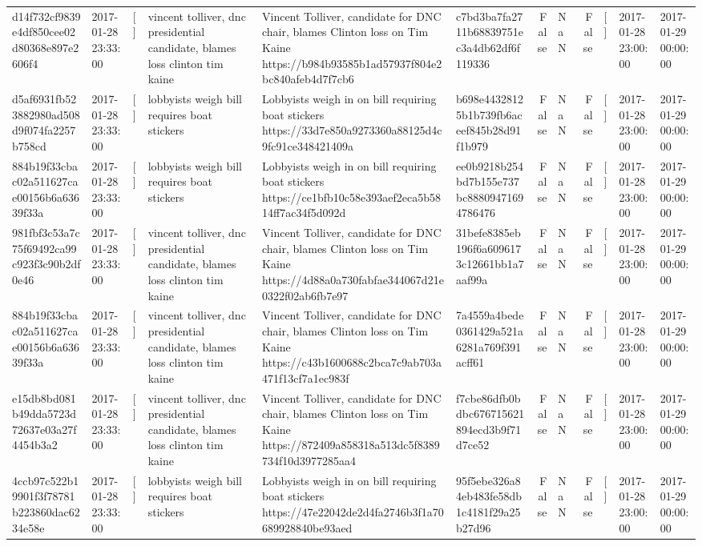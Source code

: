 \begin{tabular}{llllllrlrlll}
d14f732cf9839e4df850cee02d80368e897e2606f4 & 2017-01-28 23:33:00 & [] & vincent tolliver, dnc presidential candidate, blames loss clinton tim kaine & Vincent Tolliver, candidate for DNC chair, blames Clinton loss on Tim Kaine https://b984b93585b1ad57937f804e2bc840afeb4d7f7cb6 & c7bd3ba7fa2711b68839751ec3a4db62df6f119336 & False & NaN & False & [] & 2017-01-28 23:00:00 & 2017-01-29 00:00:00 \\
d5af6931fb523882980ad508d9f074fa2257b758cd & 2017-01-28 23:33:00 & [] & lobbyists weigh bill requires boat stickers & Lobbyists weigh in on bill requiring boat stickers https://33d7e850a9273360a88125d4c9fc91ce348421409a & b698e44328125b1b739fb6aceef845b28d91f1b979 & False & NaN & False & [] & 2017-01-28 23:00:00 & 2017-01-29 00:00:00 \\
884b19f33cbac02a511627cae00156b6a63639f33a & 2017-01-28 23:33:00 & [] & lobbyists weigh bill requires boat stickers & Lobbyists weigh in on bill requiring boat stickers https://ce1bfb10c58e393aef2eca5b5814ff7ac34f5d092d & ee0b9218b254bd7b155e737bc88809471694786476 & False & NaN & False & [] & 2017-01-28 23:00:00 & 2017-01-29 00:00:00 \\
981fbf3c53a7c75f69492ca99c923f3c90b2df0e46 & 2017-01-28 23:33:00 & [] & vincent tolliver, dnc presidential candidate, blames loss clinton tim kaine & Vincent Tolliver, candidate for DNC chair, blames Clinton loss on Tim Kaine https://4d88a0a730fabfae344067d21e0322f02ab6fb7e97 & 31befe8385eb196f6a6096173c12661bb1a7aaf99a & False & NaN & False & [] & 2017-01-28 23:00:00 & 2017-01-29 00:00:00 \\
884b19f33cbac02a511627cae00156b6a63639f33a & 2017-01-28 23:33:00 & [] & vincent tolliver, dnc presidential candidate, blames loss clinton tim kaine & Vincent Tolliver, candidate for DNC chair, blames Clinton loss on Tim Kaine https://c43b1600688c2bca7c9ab703a471f13cf7a1ec983f & 7a4559a4bede0361429a521a6281a769f391acff61 & False & NaN & False & [] & 2017-01-28 23:00:00 & 2017-01-29 00:00:00 \\
e15db8bd081b49dda5723d72637e03a27f4454b3a2 & 2017-01-28 23:33:00 & [] & vincent tolliver, dnc presidential candidate, blames loss clinton tim kaine & Vincent Tolliver, candidate for DNC chair, blames Clinton loss on Tim Kaine https://872409a858318a513dc5f8389734f10d3977285aa4 & f7cbe86dfb0bdbc676715621894ecd3b9f71d7ce52 & False & NaN & False & [] & 2017-01-28 23:00:00 & 2017-01-29 00:00:00 \\
4ccb97c522b19901f3f78781b223860dac6234e58e & 2017-01-28 23:33:00 & [] & lobbyists weigh bill requires boat stickers & Lobbyists weigh in on bill requiring boat stickers https://47e22042de2d4fa2746b3f1a70689928840be93aed & 95f5ebe326a84eb483fe58db1c4181f29a25b27d96 & False & NaN & False & [] & 2017-01-28 23:00:00 & 2017-01-29 00:00:00 \\

\end{tabular}
